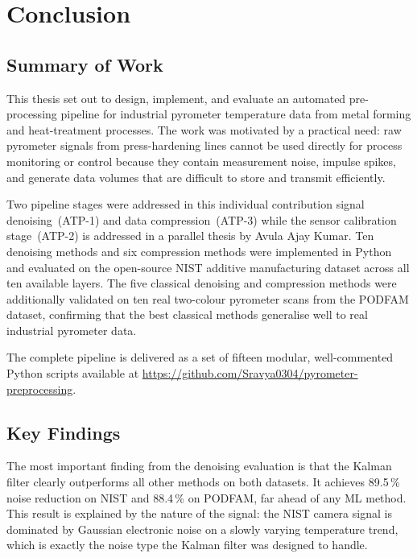 \chapter{Conclusion}
\label{cha:conclusion}

\section{Summary of Work}
\label{sec:summary}

This thesis set out to design, implement, and evaluate an automated pre-processing
pipeline for industrial pyrometer temperature data from metal forming and
heat-treatment processes. The work was motivated by a practical need: raw
pyrometer signals from press-hardening lines cannot be used directly for process
monitoring or control because they contain measurement noise, impulse spikes, and
generate data volumes that are difficult to store and transmit efficiently.

Two pipeline stages were addressed in this individual contribution  signal
denoising~(ATP-1) and data compression~(ATP-3)  while the sensor calibration
stage~(ATP-2) is addressed in a parallel thesis by Avula Ajay Kumar. Ten
denoising methods and six compression methods were implemented in Python and
evaluated on the open-source NIST additive manufacturing dataset across all ten
available layers. The five classical denoising and compression methods were
additionally validated on ten real two-colour pyrometer scans from the PODFAM
dataset, confirming that the best classical methods generalise well to real
industrial pyrometer data.

The complete pipeline is delivered as a set of fifteen modular, well-commented
Python scripts available at
\url{https://github.com/Sravya0304/pyrometer-preprocessing}.

\section{Key Findings}
\label{sec:findings}

The most important finding from the denoising evaluation is that the Kalman filter
clearly outperforms all other methods on both datasets. It achieves 89.5\,\%
noise reduction on NIST and 88.4\,\% on PODFAM, far ahead of any ML method.
This result is explained by the nature of the signal: the NIST camera signal is
dominated by Gaussian electronic noise on a slowly varying temperature trend,
which is exactly the noise type the Kalman filter was designed to handle.


